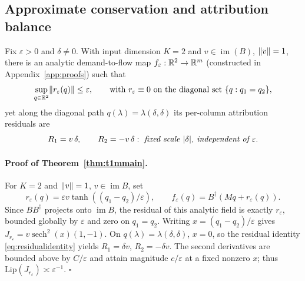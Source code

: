 \subsection{Approximate conservation and attribution balance}\label{app:approx}
\label{app:failurestatement}
\begin{theorem}\label{thm:t1mmain}
Fix $\varepsilon>0$ and $\delta\ne0$. With input dimension $K=2$ and
$v\in\operatorname{im}(B)$, $\lVert v \rVert=1$, there is an analytic
demand-to-flow map
$f_\varepsilon:\mathbb{R}^2\to\mathbb{R}^m$ (constructed in
Appendix~\ref{app:proofs}) such that
\[
\sup_{q\in\mathbb{R}^2}\lVert r_\varepsilon(q) \rVert\le\varepsilon,
\qquad\text{with } r_\varepsilon\equiv0
\text{ on the diagonal set } \{q:q_1=q_2\},
\]
yet along the diagonal path $q(\lambda)=\lambda(\delta,\delta)$ its
per-column attribution residuals are
\[
R_1=v\,\delta,\qquad R_2=-v\,\delta:
\ \text{\emph{fixed scale $|\delta|$, independent of $\varepsilon$}} .
\]
\end{theorem}

\paragraph{Proof of Theorem~\ref{thm:t1mmain}.}\label{app:tanhfamily}
For $K=2$ and $\lVert v \rVert=1$, $v\in\operatorname{im}B$, set
\[
r_\varepsilon(q)=\varepsilon v\tanh((q_1-q_2)/\varepsilon),
\qquad f_\varepsilon(q)=B^\dagger(Mq+r_\varepsilon(q)).
\]
Since $BB^\dagger$ projects onto $\operatorname{im}B$, the residual
of this analytic field is exactly $r_\varepsilon$, bounded globally
by $\varepsilon$ and zero on $q_1=q_2$. Writing
$x=(q_1-q_2)/\varepsilon$ gives
$J_{r_\varepsilon}=v\operatorname{sech}^2(x)(1,-1)$.
On $q(\lambda)=\lambda(\delta,\delta)$, $x=0$, so the residual identity
\eqref{eq:residualidentity} yields $R_1=\delta v$, $R_2=-\delta v$.
The second derivatives are bounded above by $C/\varepsilon$ and
attain magnitude $c/\varepsilon$ at a fixed nonzero $x$; thus
$\mathrm{Lip}(J_{r_\varepsilon})\asymp\varepsilon^{-1}$.
\hfill$\square$

